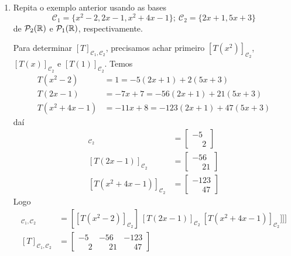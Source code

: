 \begin{exemplos}
\begin{enumerate}[label={\arabic*})]
        \item Repita o exemplo anterior usando as bases
        \[
            \mathcal{C}_1 = \{x^2 - 2, 2x - 1, x^2 + 4x - 1\};\ \mathcal{C}_{2} = \{2x + 1, 5x + 3\}
        \]
        de $\mathcal{P}_2(\mathbb{R})$ e $\mathcal{P}_1(\mathbb{R})$, respectivamente.
        \begin{solucao}
            Para determinar $[T]_{\mathcal{C}_1, \mathcal{C}_2}$, precisamos achar primeiro $[T(x^2)]_{\mathcal{C}_2}$, $[T(x)]_{\mathcal{C}_2}$ e $[T(1)]_{\mathcal{C}_2}$.
            Temos
            \begin{align*}
                T(x^2 - 2) &= 1 = -5(2x + 1) + 2(5x + 3)\\
                T(2x - 1) &= -7x + 7 = -56(2x + 1) + 21(5x + 3)\\
                T(x^2 + 4x - 1) &= -11x + 8 = -123(2x + 1) + 47(5x + 3)
            \end{align*}
            daí
            \begin{align*}
                [T(x^2 - 2)]_{\mathcal{C}_2} &= \begin{bmatrix}-5\\\phantom{-}2\end{bmatrix}\\
                [T(2x - 1)]_{\mathcal{C}_2} &= \begin{bmatrix}-56\\\phantom{-}21\end{bmatrix}\\
                [T(x^2 + 4x - 1)]_{\mathcal{C}_2} &= \begin{bmatrix}-123\\\phantom{-}47\end{bmatrix}
            \end{align*}
            Logo
            \begin{align*}
                [T]_{\mathcal{C}_1, \mathcal{C}_2} &= [[T(x^2 - 2)]_{\mathcal{C}_2}]\ [T(2x - 1)]_{\mathcal{C}_2}\ [T(x^2 + 4x - 1)]_{\mathcal{C}_2}]]]\\
                [T]_{\mathcal{C}_1, \mathcal{C}_2} &= \begin{bmatrix}-5 & -56 & -123\\\phantom{-}2 & \phantom{-}21 & \phantom{-}47\end{bmatrix}
            \end{align*}


\end{solucao}
\end{enumerate}
\end{exemplos}
